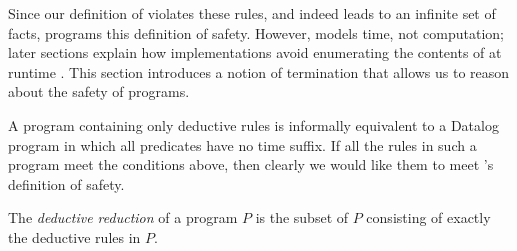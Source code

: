 
Since our definition of  violates these rules, and indeed
leads to an infinite set of facts, \slang programs  this
definition of safety.  However,  models time, not computation;
later sections explain how \lang implementations avoid enumerating the contents
of  at runtime .  This section
introduces a notion of termination that allows us to reason about the safety of
\slang programs.


  



A \slang program containing only deductive rules is informally equivalent to a
Datalog program in which all predicates have no time suffix.  If all the rules
in such a program meet the conditions above, then clearly we would like them to meet \slang's definition of safety. 

\begin{definition} 
%
The \emph{deductive reduction} of a \slang program $P$ is
the subset of $P$ consisting of exactly the deductive rules in $P$.
%
\end{definition}

